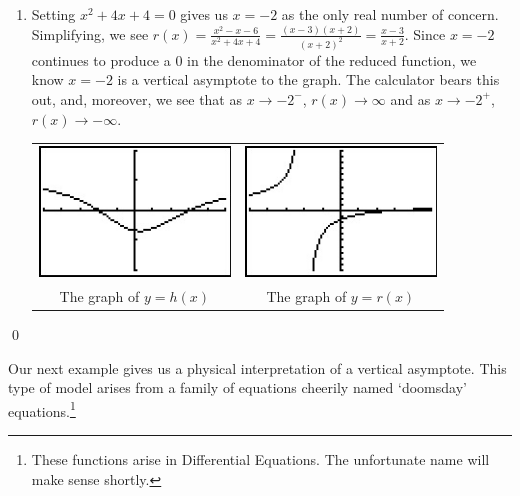 \begin{ex}
\begin{enumerate}
\item  Setting $x^2+4x+4 = 0$ gives us $x=-2$ as the only real number of concern.  Simplifying, we see  $r(x) = \frac{x^2-x-6}{x^2+4x+4} = \frac{(x-3)(x+2)}{(x+2)^2} = \frac{x-3}{x+2}$.  Since $x=-2$ continues to produce a $0$ in the denominator of the reduced function, we know $x=-2$ is a vertical asymptote to the graph.  The calculator bears this out, and, moreover, we see that as $x\rightarrow -2^{-}$, $r(x) \rightarrow \infty$ and as $x \rightarrow -2^{+}$, $r(x) \rightarrow -\infty$.


\begin{center}

\begin{tabular}{cc}

\includegraphics[width=2in]{./RationalsGraphics/Rationals04.jpg} \hspace{0.75in} & \includegraphics[width=2in]{./RationalsGraphics/Rationals05.jpg} \\

The graph of $y=h(x)$  \hspace{0.75in} & The graph of $y=r(x)$ \\


\end{tabular}
\end{center} 

\end{enumerate}
\qed
\end{ex}

Our next example gives us a physical interpretation of a vertical asymptote.  This type of model arises from a family of equations cheerily named `doomsday' equations.\footnote{These functions arise in Differential Equations.  The unfortunate name will make sense shortly.}  

